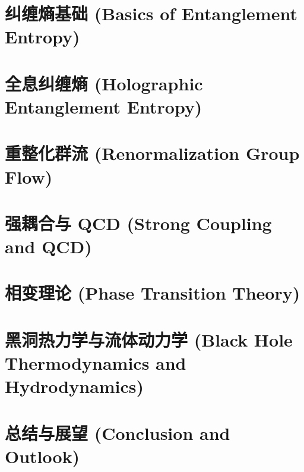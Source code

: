 \documentclass[lang=cn,10pt,chinese]{elegantbook}
\begin{document}
\chapter{纠缠熵基础 (Basics of Entanglement Entropy)}



\chapter{全息纠缠熵 (Holographic Entanglement Entropy)}



\chapter{重整化群流 (Renormalization Group Flow)}



\chapter{强耦合与 QCD (Strong Coupling and QCD)}



\chapter{相变理论 (Phase Transition Theory)}



\chapter{黑洞热力学与流体动力学 (Black Hole Thermodynamics and Hydrodynamics)}



\chapter{总结与展望 (Conclusion and Outlook)}




\printbibliography[heading=bibintoc, title=\bibname]
\end{document}
